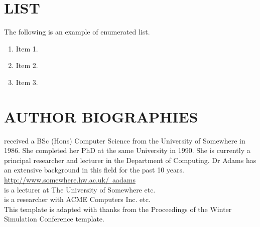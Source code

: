 \documentclass{swpaperproc}
\theoremstyle{sw}
\begin{document}
\section{LIST}

The following is an example of enumerated list.


\begin{enumerate}
\item   Item 1.
\item	Item 2.
\item	Item 3.
\end{enumerate}




\section*{AUTHOR BIOGRAPHIES}

 received a BSc (Hons) Computer Science from the University of Somewhere in
1986. She completed her PhD at the same University in 1990. She is currently a principal
researcher and lecturer in the Department of Computing. Dr Adams has an extensive background
in this field for the past 10 years. \href{http://www.somewhere.hw.ac.uk/~aadams}{http://www.somewhere.hw.ac.uk/~aadams}\\

 is a lecturer at The University of Somewhere etc.\\

 is a researcher with ACME Computers Inc. etc.\\

\noindent This template is adapted with thanks from the Proceedings of the Winter Simulation Conference template.
\end{document}
